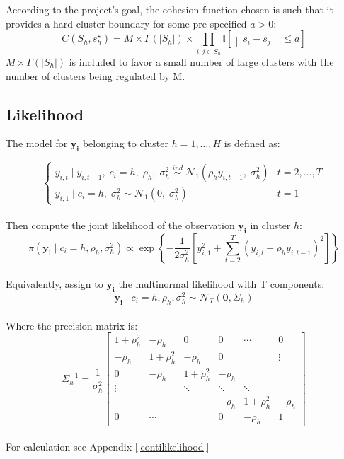 \documentclass[12pt,a4paper]{article}
\begin{document}
According to the project's goal, the cohesion function chosen is such that it provides a hard cluster boundary for some pre-specified $a>0$:
$$
C\left(S_h, s_h^{\star}\right)=M \times \Gamma\left(\left|S_h\right|\right) \times \prod_{i, j \in S_h} \mathbb{I}\left[\left\|s_i-s_j\right\| \leq a\right]
$$
$M \times \Gamma\left(\left|S_h\right|\right)$ is included to favor a small number of large clusters with the number of clusters being regulated by M.






\subsection{Likelihood}\label{likelihood}

The model for $\boldsymbol{y_{i}}$ belonging to cluster $h=1, \ldots, H $ is defined as:

$$
    \begin{cases}
     y_{i, t} \mid y_{i, t-1}, \; c_{i}=h,\; \rho_h, \;\sigma^{2}_h \; \stackrel{i n d}{\sim} \; \mathcal{N}_{1}(\rho_{h} y_{i, t-1}, \; \sigma_{h}^{2})  & t = 2, \dots, T 
     \\
      y_{i, 1} \mid c_{i}=h, \; \sigma_{h}^{2}  \sim \mathcal{N}_{1}(0, \; \sigma_{h}^{2}) & t = 1
    \end{cases}
$$\\
Then compute the joint likelihood of the observation $\boldsymbol {y_i} $ in cluster $h$:
$$
\pi\left(\boldsymbol{y_{i}} \mid c_{i}=h, \rho_h, \sigma^{2}_h\right) \propto \exp\left\{-\frac{1}{2\sigma^2_h}\left[ y_{i, 1}^{2}+\sum_{t=2}^{T} \left(y_{i, t}-\rho_{h} y_{i, t-1}\right)^{2}\right]\right\}
$$
\\
Equivalently, assign to $\boldsymbol{y_{i}}$ the multinormal likelihood with T components:
$$
\boldsymbol{y_{i}} \mid c_{i}=h, \rho_{h}, \sigma_{h}^{2} \sim \mathcal{N}_{T}\left(\boldsymbol {0}, \Sigma_{h}\right)
$$
\\
Where the precision matrix is:
$$
\Sigma_{h}^{-1}= \frac{1}{\sigma_{h}^{2}}
\left[\begin{array}{cccccc}
1+\rho_{h}^{2} & -\rho_{h} & 0 & 0 & \cdots & 0 \\
-\rho_{h} & 1+\rho_{h}^{2} & -\rho_{h} & 0 & & \vdots \\
0 & -\rho_{h} & 1+\rho_{h}^{2} & -\rho_{h} & & \\
\vdots & & \ddots & \ddots & \ddots & \\
& & & -\rho_{h} & 1+\rho_{h}^{2} & -\rho_{h} \\
0 & \cdots & & 0 & -\rho_{h} & 1
\end{array}\right]
$$
\\
For calculation see Appendix [\ref{contilikelihood}]
\end{document}
